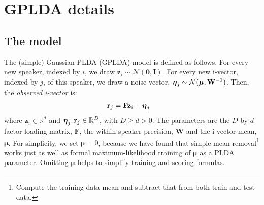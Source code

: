 \documentclass[a4paper,oneside,12pt,english]{report}
\def\zvec{\mathbf{z}}
\def\ND{\mathcal{N}}
\def\R{\mathbb{R}}
\def\Wmat{\mathbf{W}}
\def\Fmat{\mathbf{F}}
\def\Imat{\mathbf{I}}
\def\rvec{\mathbf{r}}
\def\muvec{\boldsymbol{\mu}}
\def\nulvec{\boldsymbol{0}}
\begin{document}
\chapter{GPLDA details}

\section{The model}
The (simple) Gaussian PLDA (GPLDA) model is defined as follows. For every new speaker, indexed by $i$, we draw $\zvec_i\sim\ND(\nulvec,\Imat)$. For every new i-vector, indexed by $j$, of this speaker, we draw a noise vector, $\etavec_j\sim\ND(\muvec,\Wmat^{-1})$. Then, the \emph{observed i-vector} is:
\begin{align}
\rvec_j &= \Fmat\zvec_i + \etavec_j
\end{align}
where $\zvec_i\in\R^d$ and $\etavec_j,\rvec_j\in\R^D$, with $D\ge d>0$. The parameters are the $D$-by-$d$ factor loading matrix, $\Fmat$, the within speaker precision, $\Wmat$ and the i-vector mean, $\muvec$. For simplicity, we set $\muvec=0$, because we have found that simple mean removal\footnote{Compute the training data mean and subtract that from both train and test data.} works just as well as formal maximum-likelihood training of $\muvec$ as a PLDA parameter. Omitting $\muvec$ helps to simplify training and scoring formulas. 
\end{document}
